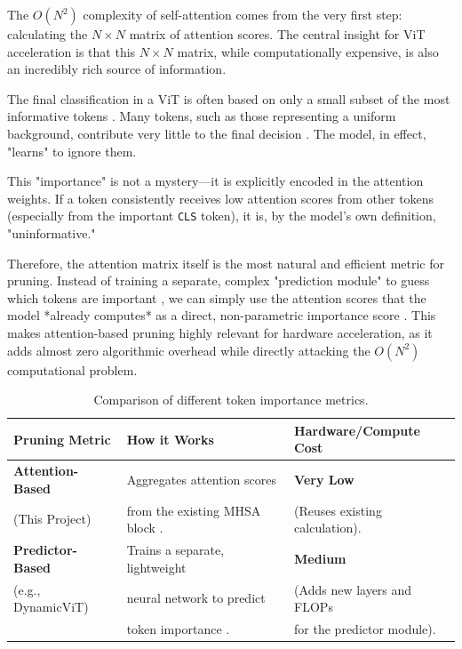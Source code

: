 The $O(N^2)$ complexity of self-attention comes from the very first step: calculating the $N \times N$ matrix of attention scores. The central insight for ViT acceleration is that this $N \times N$ matrix, while computationally expensive, is also an incredibly rich source of information.

The final classification in a ViT is often based on only a small subset of the most informative tokens \cite{ref3, ref6}. Many tokens, such as those representing a uniform background, contribute very little to the final decision \cite{ref13}. The model, in effect, "learns" to ignore them.

This "importance" is not a mystery—it is explicitly encoded in the attention weights. If a token consistently receives low attention scores from other tokens (especially from the important \texttt{CLS} token), it is, by the model's own definition, "uninformative."

Therefore, the attention matrix itself is the most natural and efficient metric for pruning. Instead of training a separate, complex "prediction module" to guess which tokens are important \cite{ref3}, we can simply use the attention scores that the model *already computes* as a direct, non-parametric importance score \cite{ref4}. This makes attention-based pruning highly relevant for hardware acceleration, as it adds almost zero algorithmic overhead while directly attacking the $O(N^2)$ computational problem.

\begin{table}[h!]
    \centering
    \begin{tabular}{|l|l|l|}
        \hline
        \textbf{Pruning Metric} & \textbf{How it Works} & \textbf{Hardware/Compute Cost} \\
        \hline
        \textbf{Attention-Based} & Aggregates attention scores & \textbf{Very Low} \\
        (This Project) & from the existing MHSA block \cite{ref4}. & (Reuses existing calculation). \\
        \hline
        \textbf{Predictor-Based} & Trains a separate, lightweight & \textbf{Medium} \\
        (e.g., DynamicViT) & neural network to predict & (Adds new layers and FLOPs \\
        & token importance \cite{ref3}. & for the predictor module). \\
        \hline
    \end{tabular}
    \caption{Comparison of different token importance metrics.}
    \label{table:pruning_metrics}
\end{table}

